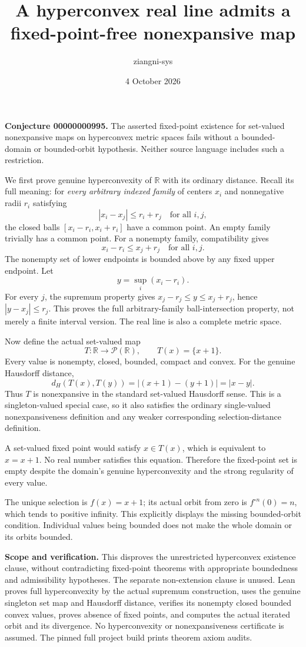 \documentclass[11pt]{article}
\title{A hyperconvex real line admits a fixed-point-free nonexpansive map}
\author{ziangni-sys}
\date{4 October 2026}
\begin{document}
\maketitle
\noindent\textbf{Conjecture 00000000995.} The asserted fixed-point existence for set-valued nonexpansive maps on hyperconvex metric spaces fails without a bounded-domain or bounded-orbit hypothesis. Neither source language includes such a restriction.

We first prove genuine hyperconvexity of \(\mathbb R\) with its ordinary distance. Recall its full meaning: for \emph{every arbitrary indexed family} of centers \(x_i\) and nonnegative radii \(r_i\) satisfying
\[
 |x_i-x_j|\le r_i+r_j\quad\text{for all }i,j,
\]
the closed balls \([x_i-r_i,x_i+r_i]\) have a common point. An empty family trivially has a common point. For a nonempty family, compatibility gives
\[
 x_i-r_i\le x_j+r_j\quad\text{for all }i,j.
\]
The nonempty set of lower endpoints is bounded above by any fixed upper endpoint. Let
\[
 y=\sup_i(x_i-r_i).
\]
For every \(j\), the supremum property gives
\(x_j-r_j\le y\le x_j+r_j\), hence \(|y-x_j|\le r_j\). This proves the full arbitrary-family ball-intersection property, not merely a finite interval version. The real line is also a complete metric space.

Now define the actual set-valued map
\[
 T:\mathbb R\longrightarrow\mathcal P(\mathbb R),\qquad T(x)=\{x+1\}.
\]
Every value is nonempty, closed, bounded, compact and convex. For the genuine Hausdorff distance,
\[
 d_H(T(x),T(y))=|(x+1)-(y+1)|=|x-y|.
\]
Thus \(T\) is nonexpansive in the standard set-valued Hausdorff sense. This is a singleton-valued special case, so it also satisfies the ordinary single-valued nonexpansiveness definition and any weaker corresponding selection-distance definition.

A set-valued fixed point would satisfy \(x\in T(x)\), which is equivalent to \(x=x+1\). No real number satisfies this equation. Therefore the fixed-point set is empty despite the domain's genuine hyperconvexity and the strong regularity of every value.

The unique selection is \(f(x)=x+1\); its actual orbit from zero is \(f^{\circ n}(0)=n\), which tends to positive infinity. This explicitly displays the missing bounded-orbit condition. Individual values being bounded does not make the whole domain or its orbits bounded.

\medskip\noindent\textbf{Scope and verification.} This disproves the unrestricted hyperconvex existence clause, without contradicting fixed-point theorems with appropriate boundedness and admissibility hypotheses. The separate non-extension clause is unused. Lean proves full hyperconvexity by the actual supremum construction, uses the genuine singleton set map and Hausdorff distance, verifies its nonempty closed bounded convex values, proves absence of fixed points, and computes the actual iterated orbit and its divergence. No hyperconvexity or nonexpansiveness certificate is assumed. The pinned full project build prints theorem axiom audits.
\end{document}
